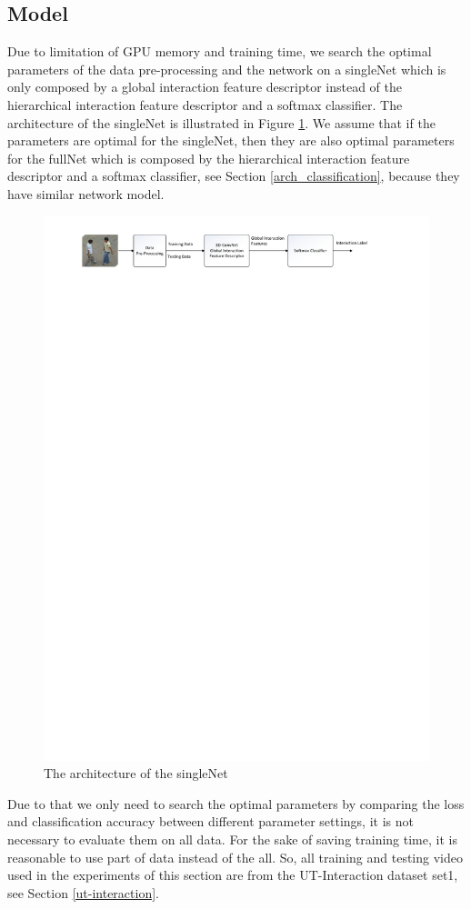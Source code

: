 \subsection{Model}
\label{tuning_network}
Due to limitation of GPU memory and training time, we search the optimal parameters of the data pre-processing and the network on a singleNet which is only composed by a global interaction feature descriptor instead of the hierarchical interaction feature descriptor and a softmax classifier. The architecture of the singleNet is illustrated in Figure \ref{fig:arch_eval}. We assume that if the parameters are optimal for the singleNet, then they are also optimal parameters for the fullNet which is composed by the hierarchical interaction feature descriptor and a softmax classifier, see Section \ref{arch_classification},  because they have similar network model.  
 \begin{figure}
 	\includegraphics[trim=2cm 26.5cm 0cm 1cm]{fig01/arch_eval.pdf}
 	\caption{The architecture of the singleNet}
 	\label{fig:arch_eval}
 \end{figure}
Due to that we only need to search the optimal parameters by comparing the loss and classification accuracy between different parameter settings, it is not necessary to evaluate them on all data. For the sake of saving training time, it is reasonable to use part of data instead of the all. So, all training and testing video used in the experiments of this section are from the UT-Interaction dataset set1, see Section \ref{ut-interaction}.  

